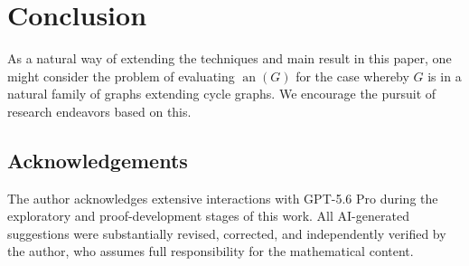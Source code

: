\documentclass[12pt]{article}
\begin{document}
\section{Conclusion}
 As a natural way of extending the techniques and main result in this paper, one might consider the problem of evaluating 
 $\operatorname{an}(G)$ for the case whereby $G$ is in a natural family of graphs extending cycle graphs.  We encourage the pursuit of 
 research endeavors based on this. 

\subsection*{Acknowledgements}
 The author acknowledges extensive interactions with GPT-5.6 Pro during the exploratory and proof-development stages of this work. All 
 AI-generated suggestions were substantially revised, corrected, and independently verified by the author, who assumes full responsibility 
 for the mathematical content. 





\end{document}

